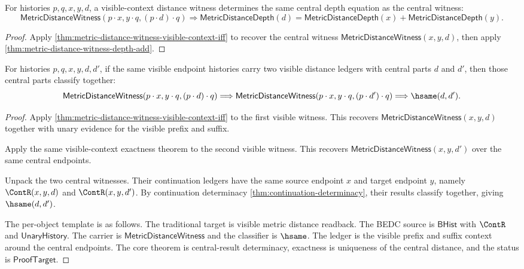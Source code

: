 

\begin{theorem}
\label{thm:metric-distance-witness-visible-context-depth-add}
For histories $p,q,x,y,d$, a visible-context distance witness determines the
same central depth equation as the central witness:
$$
\mathsf{MetricDistanceWitness}(p\cdot x,y\cdot q,(p\cdot d)\cdot q)
\Longrightarrow
\mathsf{MetricDistanceDepth}(d)
=
\mathsf{MetricDistanceDepth}(x)+\mathsf{MetricDistanceDepth}(y).
$$
\end{theorem}
\begin{proof}
Apply \autoref{thm:metric-distance-witness-visible-context-iff} to recover the
central witness $\mathsf{MetricDistanceWitness}(x,y,d)$, then apply
\autoref{thm:metric-distance-witness-depth-add}.
\end{proof}

\begin{theorem}
\label{thm:metric-distance-witness-visible-context-result-deterministic}
For histories $p,q,x,y,d,d'$, if the same visible endpoint histories carry two
visible distance ledgers with central parts $d$ and $d'$, then those central
parts classify together:
$$
\mathsf{MetricDistanceWitness}(p\cdot x,y\cdot q,(p\cdot d)\cdot q)
\Longrightarrow
\mathsf{MetricDistanceWitness}(p\cdot x,y\cdot q,(p\cdot d')\cdot q)
\Longrightarrow
\hsame(d,d').
$$
\end{theorem}
\begin{proof}
Apply \autoref{thm:metric-distance-witness-visible-context-iff} to the first
visible witness. This recovers $\mathsf{MetricDistanceWitness}(x,y,d)$ together
with unary evidence for the visible prefix and suffix.

Apply the same visible-context exactness theorem to the second visible witness.
This recovers $\mathsf{MetricDistanceWitness}(x,y,d')$ over the same central
endpoints.

Unpack the two central witnesses. Their continuation ledgers have the same
source endpoint $x$ and target endpoint $y$, namely $\ContR(x,y,d)$ and
$\ContR(x,y,d')$. By continuation determinacy
\autoref{thm:continuation-determinacy}, their results classify together, giving
$\hsame(d,d')$.

The per-object template is as follows. The traditional target is visible metric
distance readback. The BEDC source is $\mathsf{BHist}$ with $\ContR$ and
$\mathsf{UnaryHistory}$. The carrier is $\mathsf{MetricDistanceWitness}$ and the
classifier is $\hsame$. The ledger is the visible prefix and suffix context
around the central endpoints. The core theorem is central-result determinacy,
exactness is uniqueness of the central distance, and the status is
$\mathsf{ProofTarget}$.
\end{proof}

